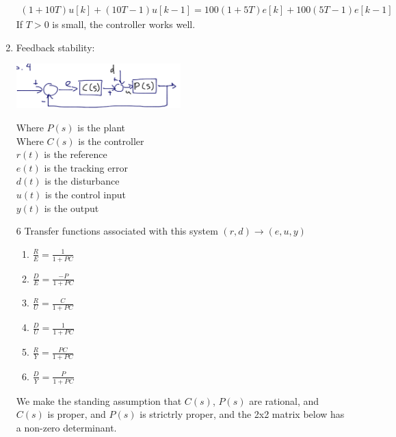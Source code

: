 \begin{enumerate}
            \begin{align*}
                (1+10T) u[k] + (10T-1)u[k-1] = 100 (1+5T)e[k] + 100(5T - 1) e[k-1]
            \end{align*}
            If $T > 0$ is small, the controller works well.

        \item Feedback stability:

            \begin{center}\includegraphics[width=0.5\textwidth,keepaspectratio]{images/5-4.png}\end{center}

            Where $P(s)$ is the plant \\
            Where $C(s)$ is the controller \\
            $r(t)$ is the reference \\
            $e(t)$ is the tracking error \\
            $d(t)$ is the disturbance \\
            $u(t)$ is the control input \\
            $y(t)$ is the output

            6 Transfer functions associated with this system $(r, d) \to (e, u, y)$

            \begin{enumerate}
                \item $\frac{R}{E} = \frac{1}{1+PC}$
                \item $\frac{D}{E} = \frac{-P}{1+PC}$
                \item $\frac{R}{U} = \frac{C}{1+PC}$
                \item $\frac{D}{U} = \frac{1}{1+PC}$
                \item $\frac{R}{Y} = \frac{PC}{1+PC}$
                \item $\frac{D}{Y} = \frac{P}{1+PC}$
            \end{enumerate}

            We make the standing assumption that $C(s)$, $P(s)$ are rational, and $C(s)$ is proper, and $P(s)$ is strictrly proper, and the 2x2 matrix below has a non-zero determinant.


\end{enumerate}
